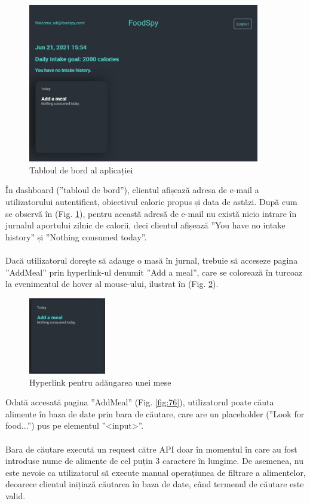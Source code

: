 \begin{figure}[!htb]
	\centering
	\includegraphics[width=0.9\textwidth]
	{../LaTeX/Images/App/dashboard.PNG}
	\caption{Tabloul de bord al aplicației}
	\label{fig:74}
\end{figure}

În dashboard (”tabloul de bord”), clientul afișează adresa de e-mail a utilizatorului autentificat, obiectivul caloric propus și data de astăzi. După cum se observă în (Fig. \ref{fig:74}), pentru această adresă de e-mail nu există nicio intrare în jurnalul aportului zilnic de calorii, deci clientul afișează ”You have no intake history” și ”Nothing consumed today”.
\\ \\
Dacă utilizatorul dorește să adauge o masă în jurnal, trebuie să acceseze pagina ”AddMeal” prin hyperlink-ul denumit ”Add a meal”, care se colorează în turcoaz la evenimentul de hover al mouse-ului, ilustrat în (Fig. \ref{fig:75}).

\begin{figure}[!htb]
	\centering
	\includegraphics[width=0.3\textwidth]
	{../LaTeX/Images/App/dashboard_add.PNG}
	\caption{Hyperlink pentru adăugarea unei mese}
	\label{fig:75}
\end{figure}

Odată accesată pagina ”AddMeal” (Fig. \ref{fig:76}), utilizatorul poate căuta alimente în baza de date prin bara de căutare, care are un placeholder (”Look for food...”) pus pe elementul ”<input>”.
\\ \\
Bara de căutare execută un request către API doar în momentul în care au fost introduse nume de alimente de cel puțin 3 caractere în lungime. De asemenea, nu este nevoie ca utilizatorul să execute manual operațiunea de filtrare a alimentelor, deoarece clientul inițiază căutarea în baza de date, când termenul de căutare este valid.

